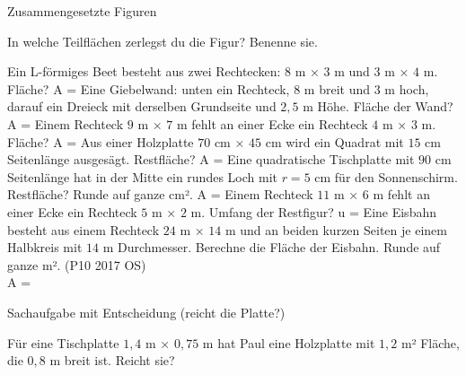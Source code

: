 \setcounter{aufgabe}{25}

\begin{aufgabe}{Zusammengesetzte Figuren}
\begin{teile}
\teil In welche Teilflächen zerlegst du die Figur? Benenne sie.

\teil Ein L-förmiges Beet besteht aus zwei Rechtecken: $8$ m × $3$ m und $3$ m × $4$ m. Fläche? A = \leerfeld[m²]
\teil Eine Giebelwand: unten ein Rechteck, $8$ m breit und $3$ m hoch, darauf ein Dreieck mit derselben Grundseite und $2{,}5$ m Höhe. Fläche der Wand? A = \leerfeld[m²]
\teil Einem Rechteck $9$ m × $7$ m fehlt an einer Ecke ein Rechteck $4$ m × $3$ m. Fläche? A = \leerfeld[m²]
\teil Aus einer Holzplatte $70$ cm × $45$ cm wird ein Quadrat mit $15$ cm Seitenlänge ausgesägt. Restfläche? A = \leerfeld[cm²]
\teil Eine quadratische Tischplatte mit $90$ cm Seitenlänge hat in der Mitte ein rundes Loch mit $r = 5$ cm für den Sonnenschirm. Restfläche? Runde auf ganze cm². A = \leerfeld[cm²]
\teil Einem Rechteck $11$ m × $6$ m fehlt an einer Ecke ein Rechteck $5$ m × $2$ m. Umfang der Restfigur? u = \leerfeld[m]
\teil Eine Eisbahn besteht aus einem Rechteck $24$ m × $14$ m und an beiden kurzen Seiten je einem Halbkreis mit $14$ m Durchmesser. Berechne die Fläche der Eisbahn. Runde auf ganze m². \hfill (P10 2017 OS) \\ A = \leerfeld[m²]
\end{teile}
\end{aufgabe}

\begin{aufgabe}{Sachaufgabe mit Entscheidung (reicht die Platte?)}
\begin{teile}
\teil Für eine Tischplatte $1{,}4$ m × $0{,}75$ m hat Paul eine Holzplatte mit $1{,}2$ m² Fläche, die $0{,}8$ m breit ist. Reicht sie?
\end{teile}
\end{aufgabe}

